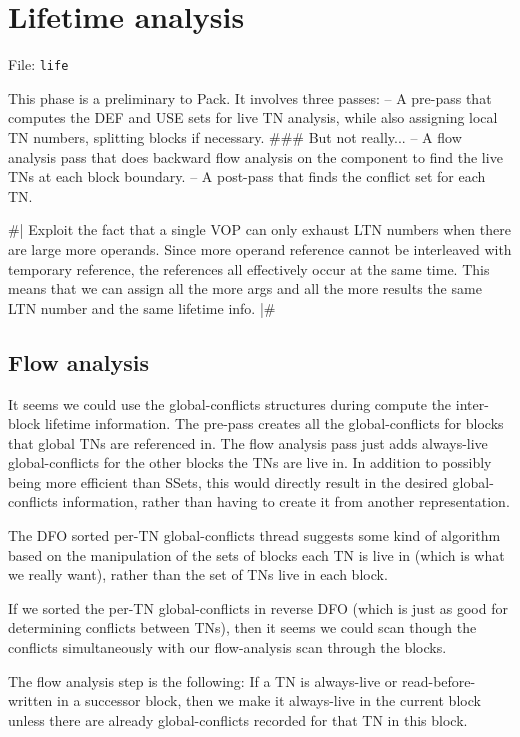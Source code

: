 \chapter{Lifetime analysis}

File: {\tt life}

This phase is a preliminary to Pack.  It involves three passes:
 -- A pre-pass that computes the DEF and USE sets for live TN analysis, while
    also assigning local TN numbers, splitting blocks if necessary.  \#\#\# But
not really...
 -- A flow analysis pass that does backward flow analysis on the
    component to find the live TNs at each block boundary.
 -- A post-pass that finds the conflict set for each TN.

\#|
Exploit the fact that a single VOP can only exhaust LTN numbers when there are
large more operands.  Since more operand reference cannot be interleaved with
temporary reference, the references all effectively occur at the same time.
This means that we can assign all the more args and all the more results the
same LTN number and the same lifetime info.
|\#

\section{Flow analysis}

It seems we could use the global-conflicts structures during compute the
inter-block lifetime information.  The pre-pass creates all the
global-conflicts for blocks that global TNs are referenced in.  The flow
analysis pass just adds always-live global-conflicts for the other blocks the
TNs are live in.  In addition to possibly being more efficient than SSets, this
would directly result in the desired global-conflicts information, rather than
having to create it from another representation.

The DFO sorted per-TN global-conflicts thread suggests some kind of algorithm
based on the manipulation of the sets of blocks each TN is live in (which is
what we really want), rather than the set of TNs live in each block.

If we sorted the per-TN global-conflicts in reverse DFO (which is just as good
for determining conflicts between TNs), then it seems we could scan though the
conflicts simultaneously with our flow-analysis scan through the blocks.

The flow analysis step is the following:
    If a TN is always-live or read-before-written in a successor block, then we
    make it always-live in the current block unless there are already
    global-conflicts recorded for that TN in this block.

